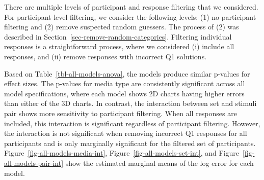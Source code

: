 \documentclass[phd]{nuthesis}
\begin{document}
There are multiple levels of participant and response filtering that we
considered. For participant-level filtering, we consider the following
levels: (1) no participant filtering and (2) remove suspected random
guessers. The process of (2) was described in
Section~\ref{sec-remove-random-categories}. Filtering individual
responses is a straightforward process, where we considered (i) include
all responses, and (ii) remove responses with incorrect Q1 solutions.

Based on Table~\ref{tbl-all-models-anova}, the models produce similar
p-values for effect sizes. The p-values for media type are consistently
significant across all model specifications, where each model shows 2D
charts having higher errors than either of the 3D charts. In contrast,
the interaction between set and stimuli pair shows more sensitivity to
participant filtering. When all responses are included, this interaction
is significant regardless of participant filtering. However, the
interaction is not significant when removing incorrect Q1 responses for
all participants and is only marginally significant for the filtered set
of participants. Figure~\ref{fig-all-models-media-int},
Figure~\ref{fig-all-models-set-int}, and
Figure~\ref{fig-all-models-pair-int} show the estimated marginal means
of the log error for each model.

\newpage
\end{document}
